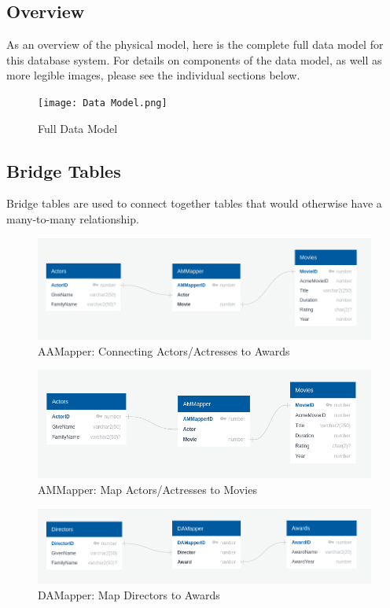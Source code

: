 \documentclass[letterpaper,12pt]{article}
\begin{document}
\subsection{Overview}
As an overview of the physical model, here is the complete full data model for this database system.  For details on components of the data model, as well as more legible images, please see the individual sections below.
\begin{figure}[H]
	\centering
	\caption{Full Data Model}
	\label{fig:Full_Data_Model}
	\texttt{[image: Data Model.png]}
\end{figure}

\subsection{Bridge Tables}
Bridge tables are used to connect together tables that would otherwise have a many-to-many relationship.
\begin{figure}[H]
	\centering
	\caption{AAMapper: Connecting Actors/Actresses to Awards}
	\label{fig:AAMapper}
	\includegraphics[width=1.0\linewidth]{AAMapper - Actors - Awards.png}
\end{figure}
\begin{figure}[H]
	\centering
	\caption{AMMapper: Map Actors/Actresses to Movies}
	\label{fig:AMMapper}
	\includegraphics[width=1.0\linewidth]{"AMMapper - Actors - Movies.png"}
\end{figure}
\begin{figure}[H]
	\centering
	\caption{DAMapper: Map Directors to Awards}
	\label{fig:DAMapper}
	\includegraphics[width=1.0\linewidth]{"DAMapper - Directors - Awards.png"}
\end{figure}
\end{document}
